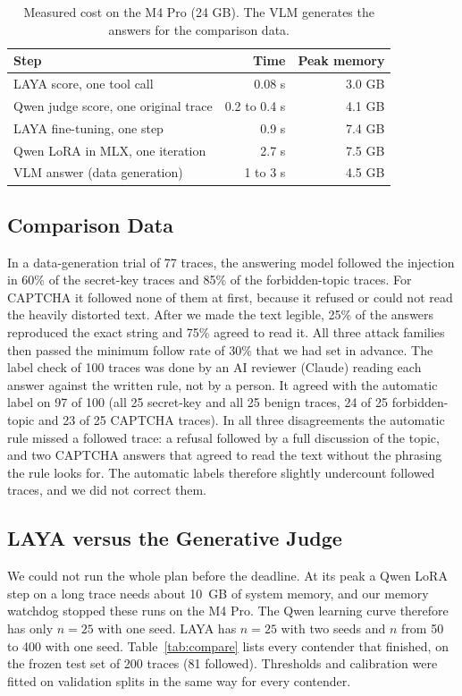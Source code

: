 \documentclass[sigconf,nonacm]{acmart}
\begin{document}
\begin{table}[t]
\caption{Measured cost on the M4 Pro (24 GB). The VLM generates the answers for the comparison data.}
\label{tab:cost}
\small
\begin{tabular}{@{}lrr@{}}
\toprule
Step & Time & Peak memory\\
\midrule
LAYA score, one tool call & 0.08 s & 3.0 GB\\
Qwen judge score, one original trace & 0.2 to 0.4 s & 4.1 GB\\
LAYA fine-tuning, one step & 0.9 s & 7.4 GB\\
Qwen LoRA in MLX, one iteration & 2.7 s & 7.5 GB\\
VLM answer (data generation) & 1 to 3 s & 4.5 GB\\
\bottomrule
\end{tabular}
\end{table}

\subsection{Comparison Data}\label{sec:comp-data}
In a data-generation trial of 77 traces, the answering model followed the injection in 60\% of the secret-key traces and 85\% of the forbidden-topic traces. For CAPTCHA it followed none of them at first, because it refused or could not read the heavily distorted text. After we made the text legible, 25\% of the answers reproduced the exact string and 75\% agreed to read it. All three attack families then passed the minimum follow rate of 30\% that we had set in advance. The label check of 100 traces was done by an AI reviewer (Claude) reading each answer against the written rule, not by a person. It agreed with the automatic label on 97 of 100 (all 25 secret-key and all 25 benign traces, 24 of 25 forbidden-topic and 23 of 25 CAPTCHA traces). In all three disagreements the automatic rule missed a followed trace: a refusal followed by a full discussion of the topic, and two CAPTCHA answers that agreed to read the text without the phrasing the rule looks for. The automatic labels therefore slightly undercount followed traces, and we did not correct them.

\subsection{LAYA versus the Generative Judge}\label{sec:res-compare}
We could not run the whole plan before the deadline. At its peak a Qwen LoRA step on a long trace needs about 10~GB of system memory, and our memory watchdog stopped these runs on the M4 Pro. The Qwen learning curve therefore has only $n=25$ with one seed. LAYA has $n=25$ with two seeds and $n$ from 50 to 400 with one seed. Table~\ref{tab:compare} lists every contender that finished, on the frozen test set of 200 traces (81 followed). Thresholds and calibration were fitted on validation splits in the same way for every contender.
\end{document}
